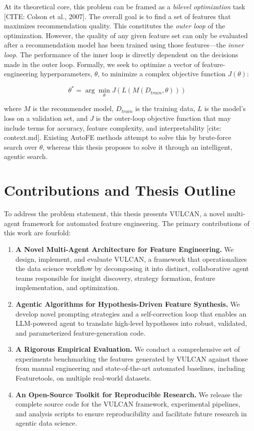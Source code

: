 At its theoretical core, this problem can be framed as a \textit{bilevel optimization} task [CITE: Colson et al., 2007]. The overall goal is to find a set of features that maximizes recommendation quality. This constitutes the \textit{outer loop} of the optimization. However, the quality of any given feature set can only be evaluated after a recommendation model has been trained using those features—the \textit{inner loop}. The performance of the inner loop is directly dependent on the decisions made in the outer loop. Formally, we seek to optimize a vector of feature-engineering hyperparameters, $\theta$, to minimize a complex objective function $J(\theta)$:

\begin{equation}
    \theta^* = \arg\min_{\theta} J(L(M(D_{train}, \theta)))
\end{equation}

where $M$ is the recommender model, $D_{train}$ is the training data, $L$ is the model's loss on a validation set, and $J$ is the outer-loop objective function that may include terms for accuracy, feature complexity, and interpretability [cite: context.md]. Existing AutoFE methods attempt to solve this by brute-force search over $\theta$, whereas this thesis proposes to solve it through an intelligent, agentic search.

\section{Contributions and Thesis Outline}
\label{sec:intro_contributions}

To address the problem statement, this thesis presents VULCAN, a novel multi-agent framework for automated feature engineering. The primary contributions of this work are fourfold:

\begin{enumerate}
    \item \textbf{A Novel Multi-Agent Architecture for Feature Engineering.} We design, implement, and evaluate VULCAN, a framework that operationalizes the data science workflow by decomposing it into distinct, collaborative agent teams responsible for insight discovery, strategy formation, feature implementation, and optimization.
    \item \textbf{Agentic Algorithms for Hypothesis-Driven Feature Synthesis.} We develop novel prompting strategies and a self-correction loop that enables an LLM-powered agent to translate high-level hypotheses into robust, validated, and parameterized feature-generation code.
    \item \textbf{A Rigorous Empirical Evaluation.} We conduct a comprehensive set of experiments benchmarking the features generated by VULCAN against those from manual engineering and state-of-the-art automated baselines, including Featuretools, on multiple real-world datasets.
    \item \textbf{An Open-Source Toolkit for Reproducible Research.} We release the complete source code for the VULCAN framework, experimental pipelines, and analysis scripts to ensure reproducibility and facilitate future research in agentic data science.
\end{enumerate}

